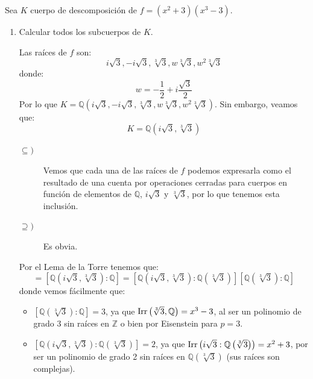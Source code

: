 \begin{ejercicio} %
    Sea $K$ cuerpo de descomposición de $f = (x^2+3)(x^3-3)$. 
    \begin{enumerate}
        \item Calcular todos los subcuerpos de $K$. 

            Las raíces de $f$ son:
            \begin{equation*}
                i\sqrt{3}, -i\sqrt{3}, \sqrt[3]{3}, w\sqrt[3]{3}, w^2\sqrt[3]{3}
            \end{equation*}
            donde:
            \begin{equation*}
                w = -\frac{1}{2}+i\frac{\sqrt{3}}{2}
            \end{equation*}
            Por lo que $K = \mathbb{Q}\left(i\sqrt{3}, -i\sqrt{3}, \sqrt[3]{3}, w\sqrt[3]{3}, w^2\sqrt[3]{3}\right)$. Sin embargo, veamos que:
            \begin{equation*}
                K = \mathbb{Q}\left(i\sqrt{3}, \sqrt[3]{3}\right)
            \end{equation*}
            \begin{description}
                \item [$\subseteq )$] Vemos que cada una de las raíces de $f$ podemos expresarla como el resultado de una cuenta por operaciones cerradas para cuerpos en función de elementos de $\mathbb{Q}$, $i\sqrt{3}$ y $\sqrt[3]{3}$, por lo que tenemos esta inclusión.
                \item [$\supseteq )$] Es obvia.
            \end{description}
            Por el Lema de la Torre tenemos que:
            \begin{equation*}
                [K:\mathbb{Q}] = \left[\mathbb{Q}\left(i\sqrt{3},\sqrt[3]{3}\right):\mathbb{Q}\right] = \left[\mathbb{Q}\left(i\sqrt{3},\sqrt[3]{3}\right):\mathbb{Q}\left(\sqrt[3]{3}\right)\right]   \left[\mathbb{Q}\left(\sqrt[3]{3}\right):\mathbb{Q}\right]
            \end{equation*}
            donde vemos fácilmente que:
            \begin{itemize}
                \item $\left[\mathbb{Q}\left(\sqrt[3]{3}\right):\mathbb{Q}\right]=3$, ya que $\operatorname{Irr}\left(\sqrt[3]{3},\mathbb{Q}\right) = x^3-3$, al ser un polinomio de grado 3 sin raíces en $\mathbb{Z}$ o bien por Eisenstein para $p=3$.
                \item $ \left[\mathbb{Q}\left(i\sqrt{3},\sqrt[3]{3}\right):\mathbb{Q}\left(\sqrt[3]{3}\right)\right] = 2$, ya que $\operatorname{Irr}\left(i\sqrt{3}:\mathbb{Q}\left(\sqrt[3]{3}\right)\right) = x^2+3$, por ser un polinomio de grado 2 sin raíces en $\mathbb{Q}\left(\sqrt[3]{3}\right)$ (sus raíces son complejas).

\end{itemize}
\end{enumerate}
\end{ejercicio}
